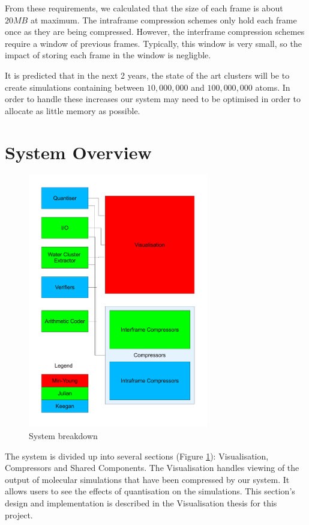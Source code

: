 \documentclass[a4paper,11pt]{report}
\begin{document}
From these requirements, we calculated that the size of each frame is about $20MB$ at maximum. The intraframe compression schemes only hold each frame once as they are being compressed. However, the interframe compression schemes require a window of previous frames. Typically, this window is very small, so the impact of storing each frame in the window is negligble.

It is predicted that in the next 2 years, the state of the art clusters will be to create simulations containing between $10,000,000$ and $100,000,000$ atoms. In order to handle these increases our system may need to be optimised in order to allocate as little memory as possible.


\section{System Overview}

\begin{figure}[h]
 \center
 \includegraphics[width=0.7\textwidth]{resources/Breakdown-connect.pdf}
\caption{System breakdown}
\label{sysbreak}
\end{figure}

The system is divided up into several sections (Figure \ref{sysbreak}): Visualisation, Compressors and Shared Components. The Visualisation handles viewing of the output of molecular simulations that have been compressed by our system. It allows users to see the effects of quantisation on the simulations. This section's design and implementation is described in the Visualisation thesis\cite{minvis} for this project. 
\end{document}
